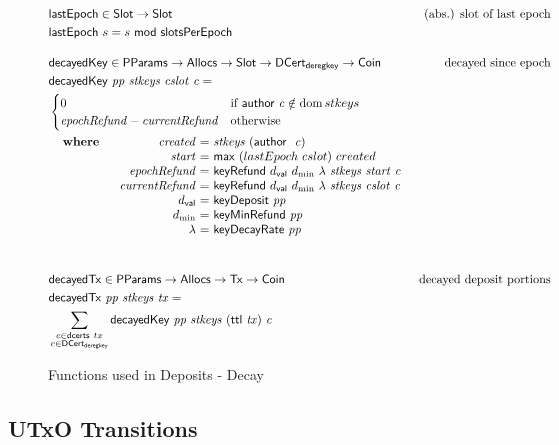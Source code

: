 \documentclass[11pt,a4paper,dvipsnames]{article}
\newcommand{\Tx}{\type{Tx}}
\newcommand{\Coin}{\type{Coin}}
\newcommand{\PParams}{\type{PParams}}
\newcommand{\Slot}{\type{Slot}}
\newcommand{\Allocs}{\type{Allocs}}
\newcommand{\DCertDeRegKey}{\type{DCert_{deregkey}}}
\newcommand{\ttl}[1]{\fun{ttl}~ \var{#1}}
\newcommand{\decayedKey}[4]{\fun{decayedKey}~ \var{#1}~ \var{#2}~ \var{#3}~ \var{#4}}
\newcommand{\decayedTx}[3]{\fun{decayedTx}~ \var{#1}~ \var{#2}~ \var{#3}}
\newcommand{\keyRefund}[6]{\fun{keyRefund}~ {#1}~{#2}~{#3}~\var{#4}~\var{#5}~\var{#6}}
\newcommand{\cauthor}[1]{\fun{author}~ \var{#1}}
\newcommand{\dval}{\ensuremath{d_{\mathsf{val}}}}
\newcommand{\slotsPer}{\ensuremath{\mathsf{slotsPerEpoch}}}
\theoremstyle{definition}
\theoremstyle{definition}
\begin{document}
\begin{figure}
  \begin{align*}
      & \fun{lastEpoch} \in \Slot \to \Slot
      & \text{(abs.) slot of last epoch} \\
      & \fun{lastEpoch}~{s} =  s~\mathsf{mod}~\slotsPer
      \nextdef
      & \fun{decayedKey} \in
      \PParams \to \Allocs \to \Slot \to \DCertDeRegKey \to \Coin
      & \text{decayed since epoch} \\
      & \decayedKey{pp}{stkeys}{cslot}{c} =\\
      & \begin{cases}
            0 & \text{if}~\cauthor c \notin \dom stkeys\\
            \var{epochRefund} - \var{currentRefund}
            & \text{otherwise}
        \end{cases}\\
      &
      \begin{array}{lr@{~=~}l}
        \where
          & \var{created} & \var{stkeys}~(\cauthor~\var{c}) \\
          & \var{start} & \mathsf{max}~(lastEpoch~cslot)~created \\
          & \var{epochRefund} & \keyRefund{\dval}{d_{\min}}{\lambda}{stkeys}{start}{c} \\
          & \var{currentRefund} & \keyRefund{\dval}{d_{\min}}{\lambda}{stkeys}{cslot}{c} \\
          & \dval & \fun{keyDeposit}~\var{pp}\\
          & d_{\min} & \fun{keyMinRefund}~\var{pp}\\
          & \lambda & \fun{keyDecayRate}~\var{pp}\\
      \end{array}\\
      \nextdef
      & \fun{decayedTx} \in \PParams \to \Allocs \to \Tx \to \Coin
      & \text{decayed deposit portions} \\
      & \decayedTx{pp}{stkeys}{tx} =\\
      &   \sum\limits_{\substack{c \in \fun{dcerts}~tx \\ c \in\DCertDeRegKey}}
          \decayedKey{pp}{stkeys}{(\ttl{tx})}{c}\\
  \end{align*}
  \caption{Functions used in Deposits - Decay}
  \label{fig:functions:deposits-decay}
\end{figure}

\clearpage

\subsection{UTxO Transitions}
\label{sec:state-trans-utxo-1}
\end{document}
